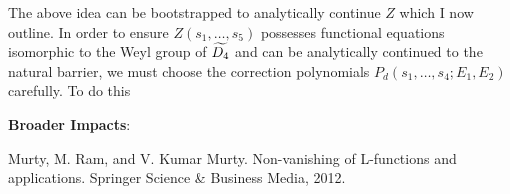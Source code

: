 \documentclass[12pt,reqno,oneside]{amsart}
\begin{document}
The above idea can be bootstrapped to analytically continue $Z$ which I now outline. In order to ensure $Z(s_{1},\ldots,s_{5})$ possesses functional equations isomorphic to the Weyl group of $\widetilde{D_{4}}$ and can be analytically continued to the natural barrier, we must choose the correction polynomials $P_{d}(s_{1},\ldots,s_{4};E_{1},E_{2})$ carefully. To do this 

\textbf{Broader Impacts}:

\begin{thebibliography}{}
  Murty, M. Ram, and V. Kumar Murty. Non-vanishing of L-functions and applications. Springer Science \& Business Media, 2012.
\end{thebibliography}
\end{document}
